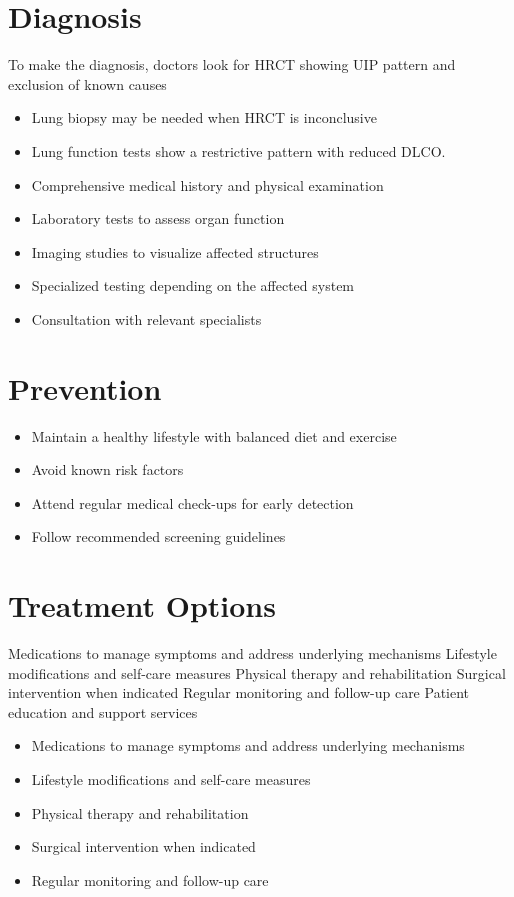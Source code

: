 \section{Diagnosis}
To make the diagnosis, doctors look for HRCT showing UIP pattern and exclusion of known causes

\begin{itemize}[noitemsep]
  \item Lung biopsy may be needed when HRCT is inconclusive
  \item Lung function tests show a restrictive pattern with reduced DLCO.
  \item Comprehensive medical history and physical examination
  \item Laboratory tests to assess organ function
  \item Imaging studies to visualize affected structures
  \item Specialized testing depending on the affected system
  \item Consultation with relevant specialists
\end{itemize}
\section{Prevention}
\begin{itemize}[noitemsep]
  \item Maintain a healthy lifestyle with balanced diet and exercise
  \item Avoid known risk factors
  \item Attend regular medical check-ups for early detection
  \item Follow recommended screening guidelines
\end{itemize}
\section{Treatment Options}
Medications to manage symptoms and address underlying mechanisms Lifestyle modifications and self-care measures Physical therapy and rehabilitation Surgical intervention when indicated Regular monitoring and follow-up care Patient education and support services

\begin{itemize}[noitemsep]
  \item Medications to manage symptoms and address underlying mechanisms
  \item Lifestyle modifications and self-care measures
  \item Physical therapy and rehabilitation
  \item Surgical intervention when indicated
  \item Regular monitoring and follow-up care
\end{itemize}
